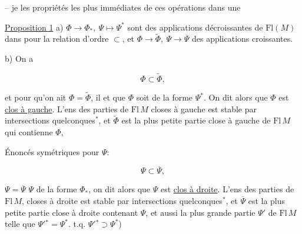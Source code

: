 

-- je  les propriétés les plus immédiates de ces opérations dans une

\uline{Proposition 1} \quad a) $\Phi\to\Phi_*,\ \Psi\mapsto\Psi^*$ sont des applications décroissantes de $\mathrm{Fl}(M)$ dans  pour la relation d'ordre $\subset$, et $\Phi\to\widetilde\Phi,\ \Psi\to\overline\Psi$ des applications croissantes. 

b)  On a

\[ \Phi\subset\widetilde\Phi, \]

et pour qu'on ait $\Phi=\widetilde\Phi$, il  et  que $\Phi$ soit de la forme $\Psi^*$. On dit alors que $\Phi$ est \uline{clos à gauche}. \deleted{\unsure{\(\Phi\)}} L'ens des parties de $\mathrm{Fl}\,M$ closes à gauche est stable par intersections quelconques$^{*}$, et $\widetilde\Phi$ est la plus petite partie close à gauche de $\mathrm{Fl}\,M$ qui contienne $\Phi$, 



Énoncés symétriques pour $\Psi$: \unsure{$\ldots$}

\[ \Psi\subset\overline\Psi, \]

 $\Psi=\overline\Psi$  $\Psi$ de la forme $\Phi_*$, on dit alors que $\Psi$ est \uline{clos à droite}. L'ens des parties de $\mathrm{Fl}\,M$, closes à droite est stable par intersections quelconques$^*$, et $\overline\Psi$ est la plus petite partie close à droite contenant $\Psi$, et aussi la plus grande partie $\Psi'$ de $\mathrm{Fl}\,M$ telle que $\Psi'{}^*=\Psi^*$.  t.q. $\Psi'{}^*\supset\Psi^*$)



